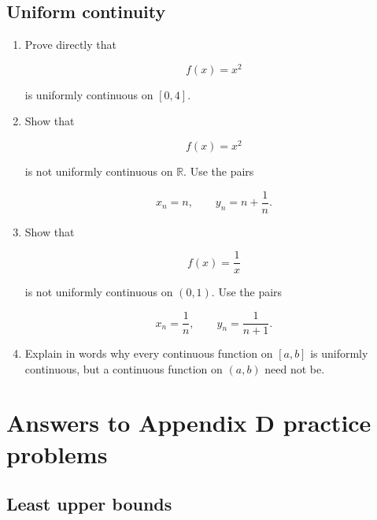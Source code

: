 \subsection*{Uniform continuity}

\begin{enumerate}
\item Prove directly that

\[
f(x)=x^2
\]

is uniformly continuous on \([0,4]\).

\item Show that

\[
f(x)=x^2
\]

is not uniformly continuous on \(\mathbb R\).  Use the pairs

\[
x_n=n,
\qquad
y_n=n+\frac1n.
\]

\item Show that

\[
f(x)=\frac1x
\]

is not uniformly continuous on \((0,1)\).  Use the pairs

\[
x_n=\frac1n,
\qquad
y_n=\frac1{n+1}.
\]

\item Explain in words why every continuous function on \([a,b]\) is uniformly
continuous, but a continuous function on \((a,b)\) need not be.
\end{enumerate}

\section*{Answers to Appendix D practice problems}
\label{ans:appendix-d-practice}

\subsection*{Least upper bounds}

